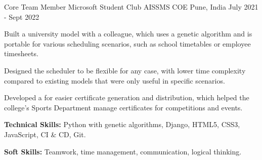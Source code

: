 \begin{cventries}
  \cventry
    {Core Team Member Microsoft Student Club} %
    {AISSMS COE} %
    {Pune, India} %
    {July 2021 - Sept 2022} %
    {
      \begin{cvitems} %
        \item {Built a university  model with a colleague, which uses a genetic algorithm and is portable for various scheduling scenarios, such as school timetables or employee timesheets.}
        \item {Designed the scheduler to be flexible for any case, with lower time complexity compared to existing models that were only useful in specific scenarios.}
        \item {Developed a  for easier certificate generation and distribution, which helped the college's Sports Department manage certificates for competitions and events.}
        \item {\textbf{Technical Skills:} Python with genetic algorithms, Django, HTML5, CSS3, JavaScript, CI \& CD, Git.}
        \item {\textbf{Soft Skills:} Teamwork, time management, communication, logical thinking.}
      \end{cvitems}
    }

\end{cventries}
